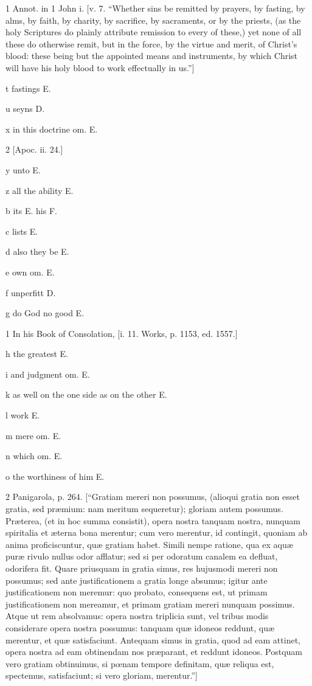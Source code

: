 1
Annot. in 1 John i. [v. 7. “Whether sins be remitted by prayers, by fasting, by alms, by faith, by charity, by sacrifice, by sacraments, or by the priests, (as the holy Scriptures do plainly attribute remission to every of these,) yet none of all these do otherwise remit, but in the force, by the virtue and merit, of Christ’s blood: these being but the appointed means and instruments, by which Christ will have his holy blood to work effectually in us.”]

t
fastings E.

u
seyns D.

x
in this doctrine om. E.

2
[Apoc. ii. 24.]

y
unto E.

z
all the ability E.

b
its E. his F.

c
lists E.

d
also they be E.

e
own om. E.

f
unperfitt D.

g
do God no good E.

1
In his Book of Consolation, [i. 11. Works, p. 1153, ed. 1557.]

h
the greatest E.

i
and judgment om. E.

k
as well on the one side as on the other E.

l
work E.

m
mere om. E.

n
which om. E.

o
the worthiness of him E.

2
Panigarola, p. 264. [“Gratiam mereri non possumus, (alioqui gratia non esset gratia, sed præmium: nam meritum sequeretur); gloriam autem possumus. Præterea, (et in hoc summa consistit), opera nostra tanquam nostra, nunquam spiritalia et æterna bona merentur; cum vero merentur, id contingit, quoniam ab anima proficiscuntur, quæ gratiam habet. Simili nempe ratione, qua ex aquæ puræ rivulo nullus odor afflatur; sed si per odoratum canalem ea defluat, odorifera fit. Quare priusquam in gratia simus, res hujusmodi mereri non possumus; sed ante justificationem a gratia longe absumus; igitur ante justificationem non meremur: quo probato, consequens est, ut primam justificationem non mereamur, et primam gratiam mereri nunquam possimus. Atque ut rem absolvamus: opera nostra triplicia sunt, vel tribus modis considerare opera nostra possumus: tanquam quæ idoneos reddunt, quæ merentur, et quæ satisfaciunt. Antequam simus in gratia, quod ad eam attinet, opera nostra ad eam obtinendam nos præparant, et reddunt idoneos. Postquam vero gratiam obtinuimus, si pœnam tempore definitam, quæ reliqua est, spectemus, satisfaciunt; si vero gloriam, merentur.”]


